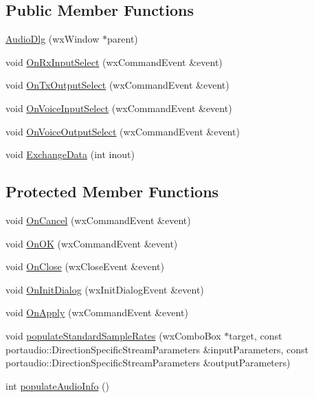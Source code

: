 \subsection*{Public Member Functions}
\begin{DoxyCompactItemize}
\item 
\hyperlink{class_audio_dlg_aca8f77272717136445248c9dce578bed}{Audio\-Dlg} (wx\-Window $\ast$parent)
\item 
void \hyperlink{class_audio_dlg_ade43627922e25e984ca4ebff7bf70339}{On\-Rx\-Input\-Select} (wx\-Command\-Event \&event)
\item 
void \hyperlink{class_audio_dlg_a37703c36702cb622f0ceb152fdcb6d1c}{On\-Tx\-Output\-Select} (wx\-Command\-Event \&event)
\item 
void \hyperlink{class_audio_dlg_a9e472e745d49396f1d3c8f8907e6601f}{On\-Voice\-Input\-Select} (wx\-Command\-Event \&event)
\item 
void \hyperlink{class_audio_dlg_a2711e45fea17d5f76c2453fc9654b008}{On\-Voice\-Output\-Select} (wx\-Command\-Event \&event)
\item 
void \hyperlink{class_audio_dlg_a21490d0af79a4284bc6d76e0e9e24007}{Exchange\-Data} (int inout)
\end{DoxyCompactItemize}
\subsection*{Protected Member Functions}
\begin{DoxyCompactItemize}
\item 
void \hyperlink{class_audio_dlg_ac0710354a8a791b7c8d8987d1bc175a7}{On\-Cancel} (wx\-Command\-Event \&event)
\item 
void \hyperlink{class_audio_dlg_a5343cdb33868fdf568d05152b642039c}{On\-O\-K} (wx\-Command\-Event \&event)
\item 
void \hyperlink{class_audio_dlg_a9e0ad3464f137b8c9a6de4a558818cf3}{On\-Close} (wx\-Close\-Event \&event)
\item 
void \hyperlink{class_audio_dlg_af216bf6872bb49734b3c32b0a9122d8a}{On\-Init\-Dialog} (wx\-Init\-Dialog\-Event \&event)
\item 
void \hyperlink{class_audio_dlg_ab09ae2516d75502062744b924e33fe8b}{On\-Apply} (wx\-Command\-Event \&event)
\item 
void \hyperlink{class_audio_dlg_a194ed3fb219d7a93824884015e625fe8}{populate\-Standard\-Sample\-Rates} (wx\-Combo\-Box $\ast$target, const portaudio\-::\-Direction\-Specific\-Stream\-Parameters \&input\-Parameters, const portaudio\-::\-Direction\-Specific\-Stream\-Parameters \&output\-Parameters)
\item 
int \hyperlink{class_audio_dlg_ad1acb1d52175795d265d7adcafc10316}{populate\-Audio\-Info} ()
\end{DoxyCompactItemize}
